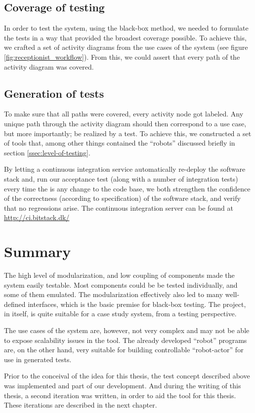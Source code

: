 \subsection{Coverage of testing}
In order to test the system, using the black-box method, we needed to formulate the tests in a way that provided the broadest coverage possible. To achieve this, we crafted a set of activity diagrams from the use cases of the system (see figure \ref{fig:receptionist_workflow}). From this, we could assert that every path of the activity diagram was covered.

\subsection{Generation of tests}
To make sure that all paths were covered, every activity node got labeled. Any unique path through the activity diagram should then correspond to a use case, but more importantly; be realized by a test. To achieve this, we constructed a set of tools that, among other things contained the ``robots'' discussed briefly in section \ref{ssec:level-of-testing}.\medskip

\noindent By letting a continuous integration service automatically re-deploy the software stack and, run our acceptance test (along with a number of integration tests) every time the is any change to the code base, we both strengthen the confidence of the correctness (according to specification) of the software stack, and verify that no regressions arise. The continuous integration server can be found at \url{http://ci.bitstack.dk/}

\section{Summary}
The high level of modularization, and low coupling of components made the system easily testable. Most components could be be tested individually, and some of them emulated. The modularization effectively also led to many well-defined interfaces, which is the basic premise for black-box testing. The project, in itself, is quite suitable for a case study system, from a testing perspective.\medskip

\noindent The use cases of the system are, however, not very complex and may not be able to expose scalability issues in the tool. The already developed ``robot'' programs are, on the other hand, very suitable for building controllable ``robot-actor'' for use in generated tests.\medskip

\noindent Prior to the conceival of the idea for this thesis, the test concept described above was implemented and part of our development. And during the writing of this thesis, a second iteration was written, in order to aid the tool for this thesis. These iterations are described in the next chapter.